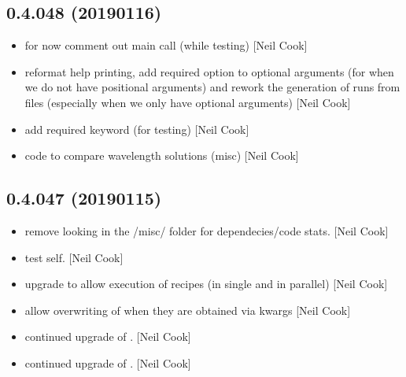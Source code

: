 \documentclass[a4paper,10pt,english]{report}
\begin{document}
\subsection{0.4.048 (2019\sphinxhyphen{}01\sphinxhyphen{}16)}
\label{\detokenize{misc/changelog:id234}}\begin{itemize}
\item {} 
 \sphinxhyphen{} for now comment out main call (while testing)
{[}Neil Cook{]}

\item {} 
 \sphinxhyphen{} reformat help printing, add required option to
optional arguments (for when we do not have positional arguments) and
rework the generation of runs from files (especially when we only have
optional arguments) {[}Neil Cook{]}

\item {} 
 \sphinxhyphen{} add required keyword (for testing) {[}Neil Cook{]}

\item {} 
 \sphinxhyphen{} code to compare wavelength solutions (misc) {[}Neil Cook{]}

\end{itemize}


\subsection{0.4.047 (2019\sphinxhyphen{}01\sphinxhyphen{}15)}
\label{\detokenize{misc/changelog:id235}}\begin{itemize}
\item {} 
 \sphinxhyphen{} remove looking in the /misc/ folder for
dependecies/code stats. {[}Neil Cook{]}

\item {} 
 \sphinxhyphen{} test self. {[}Neil Cook{]}

\item {} 
 \sphinxhyphen{} upgrade to allow execution of recipes (in single
and in parallel) {[}Neil Cook{]}

\item {} 
 \sphinxhyphen{} allow overwriting of  when they are
obtained via kwargs  {[}Neil Cook{]}

\item {} 
 \sphinxhyphen{} continued upgrade of . {[}Neil Cook{]}

\item {} 
 \sphinxhyphen{} continued upgrade of . {[}Neil Cook{]}

\end{itemize}
\end{document}
